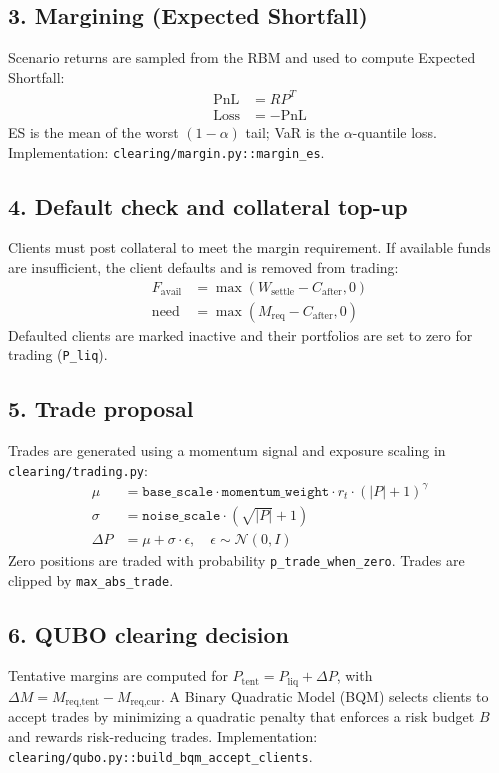 \documentclass[11pt]{article}
\begin{document}
\subsection{3. Margining (Expected Shortfall)}
Scenario returns are sampled from the RBM and used to compute Expected Shortfall:
\begin{align*}
\text{PnL} &= R P^T \\
\text{Loss} &= -\text{PnL}
\end{align*}
ES is the mean of the worst $(1-\alpha)$ tail; VaR is the $\alpha$-quantile loss.
Implementation: \texttt{clearing/margin.py::margin\_es}.

\subsection{4. Default check and collateral top-up}
Clients must post collateral to meet the margin requirement. If available funds
are insufficient, the client defaults and is removed from trading:
\begin{align*}
F_{\text{avail}} &= \max(W_{\text{settle}} - C_{\text{after}}, 0) \\
\text{need} &= \max(M_{\text{req}} - C_{\text{after}}, 0)
\end{align*}
Defaulted clients are marked inactive and their portfolios are set to zero for
trading (\texttt{P\_liq}).

\subsection{5. Trade proposal}
Trades are generated using a momentum signal and exposure scaling in
\texttt{clearing/trading.py}:
\begin{align*}
\mu &= \texttt{base\_scale} \cdot \texttt{momentum\_weight} \cdot r_t \cdot (|P|+1)^{\gamma} \\
\sigma &= \texttt{noise\_scale} \cdot (\sqrt{|P|}+1) \\
\Delta P &= \mu + \sigma \cdot \epsilon,\quad \epsilon \sim \mathcal{N}(0,I)
\end{align*}
Zero positions are traded with probability \texttt{p\_trade\_when\_zero}. Trades are
clipped by \texttt{max\_abs\_trade}.

\subsection{6. QUBO clearing decision}
Tentative margins are computed for $P_{\text{tent}} = P_{\text{liq}} + \Delta P$,
with $\Delta M = M_{\text{req,tent}} - M_{\text{req,cur}}$. A Binary Quadratic Model
(BQM) selects clients to accept trades by minimizing a quadratic penalty that
enforces a risk budget $B$ and rewards risk-reducing trades. Implementation:
\texttt{clearing/qubo.py::build\_bqm\_accept\_clients}.
\end{document}
